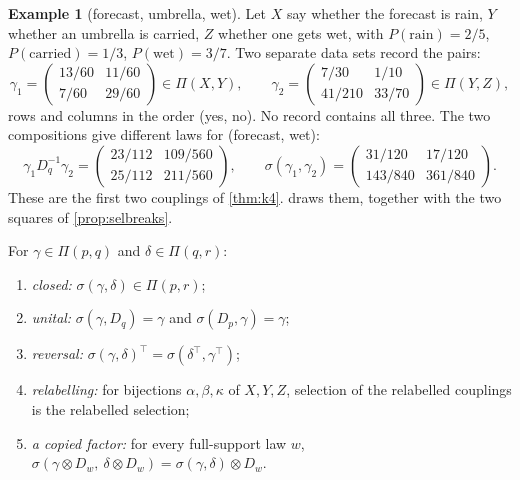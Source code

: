 \documentclass[11pt]{article}
\theoremstyle{definition}\newtheorem{definition}[theorem]{Definition}\newtheorem{remark}[theorem]{Remark}\newtheorem{example}[theorem]{Example}\newtheorem{problem}[theorem]{Open problem}\crefname{problem}{Problem}{Problems}
\begin{document}
\begin{example}[forecast, umbrella, wet]\label{ex:umbrella}
Let $X$ say whether the forecast is rain, $Y$ whether an umbrella is carried, $Z$ whether one gets wet, with $P(\text{rain})=2/5$, $P(\text{carried})=1/3$, $P(\text{wet})=3/7$. Two separate data sets record
the pairs:
\[
\gamma_1=\begin{pmatrix}13/60&11/60\\7/60&29/60\end{pmatrix}\in\Pi(X,Y),\qquad \gamma_2=\begin{pmatrix}7/30&1/10\\41/210&33/70\end{pmatrix}\in\Pi(Y,Z),
\]
rows and columns in the order (yes, no). No record contains all three. The two compositions give different laws for (forecast, wet):
\[
\gamma_1D_q^{-1}\gamma_2=\begin{pmatrix}23/112&109/560\\25/112&211/560\end{pmatrix},\qquad \sigma(\gamma_1,\gamma_2)=\begin{pmatrix}31/120&17/120\\143/840&361/840\end{pmatrix}.
\]
These are the first two couplings of \cref{thm:k4}.  draws them, together with the two squares of \cref{prop:selbreaks}.
\end{example}

\begin{proposition}\label{prop:selkeeps}
For $\gamma\in\Pi(p,q)$ and $\delta\in\Pi(q,r)$:
\begin{enumerate}
\item[(1)] \emph{closed:} $\sigma(\gamma,\delta)\in\Pi(p,r)$;
\item[(2)] \emph{unital:} $\sigma(\gamma,D_q)=\gamma$ and $\sigma(D_p,\gamma)=\gamma$;
\item[(3)] \emph{reversal:} $\sigma(\gamma,\delta)^{\!\top}=\sigma(\delta^{\!\top},\gamma^{\!\top})$;
\item[(4)] \emph{relabelling:} for bijections $\alpha,\beta,\kappa$ of $X,Y,Z$, selection of the relabelled couplings is the relabelled selection;
\item[(5)] \emph{a copied factor:} for every full-support law $w$, $\sigma(\gamma\otimes D_w,\ \delta\otimes D_w)=\sigma(\gamma,\delta)\otimes D_w$.
\end{enumerate}
\end{proposition}
\end{document}
